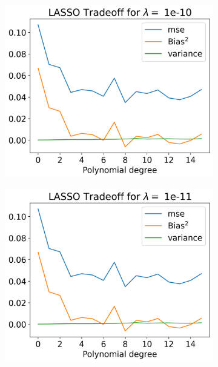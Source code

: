 \documentclass[12pt]{article}
\begin{document}
\begin{figure}[H]
  \begin{subfigure}{.5\textwidth}
    \centering
    \includegraphics[width=\textwidth]{../figures/tradeoff_LASSO_1e-10.png}
    \caption{}
    \label{fig:l_1e-10}
  \end{subfigure}
  \begin{subfigure}{.5\textwidth}
    \centering
    \includegraphics[width=\textwidth]{../figures/tradeoff_LASSO_1e-11.png}
    \caption{}
    \label{fig:l_1e-1}
  \end{subfigure}
  \begin{subfigure}{.5\textwidth}

\end{subfigure}
\end{figure}
\end{document}

